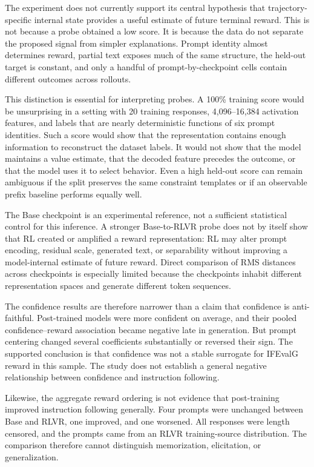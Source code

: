 \documentclass[manuscript,screen,nonacm]{acmart}
\begin{document}
The experiment does not currently support its central hypothesis that
trajectory-specific internal state provides a useful estimate of future
terminal reward. This is not because a probe obtained a low score. It is
because the data do not separate the proposed signal from simpler
explanations. Prompt identity almost determines reward, partial text exposes
much of the same structure, the held-out target is constant, and only a handful
of prompt-by-checkpoint cells contain different outcomes across rollouts.

This distinction is essential for interpreting probes. A 100\% training score
would be unsurprising in a setting with 20 training responses, 4,096--16,384
activation features, and labels that are nearly deterministic functions of six
prompt identities. Such a score would show that the representation contains
enough information to reconstruct the dataset labels. It would not show that the
model maintains a value estimate, that the decoded feature precedes the
outcome, or that the model uses it to select behavior. Even a high held-out
score can remain ambiguous if the split preserves the same constraint
templates or if an observable prefix baseline performs equally well.

The Base checkpoint is an experimental reference, not a sufficient statistical
control for this inference. A stronger Base-to-RLVR probe does not by itself
show that RL created or amplified a reward representation: RL may alter prompt
encoding, residual scale, generated text, or separability without improving a
model-internal estimate of future reward. Direct comparison of RMS distances
across checkpoints is especially limited because the checkpoints inhabit
different representation spaces and generate different token sequences.

The confidence results are therefore narrower than a claim that confidence is
anti-faithful. Post-trained models were more confident on average, and their
pooled confidence--reward association became negative late in generation. But
prompt centering changed several coefficients substantially or reversed their
sign. The supported conclusion is that confidence was not a stable surrogate
for IFEvalG reward in this sample. The study does not establish a general
negative relationship between confidence and instruction following.

Likewise, the aggregate reward ordering is not evidence that post-training
improved instruction following generally. Four prompts were unchanged between
Base and RLVR, one improved, and one worsened. All responses were length
censored, and the prompts came from an RLVR training-source distribution. The
comparison therefore cannot distinguish memorization, elicitation, or
generalization.
\end{document}
